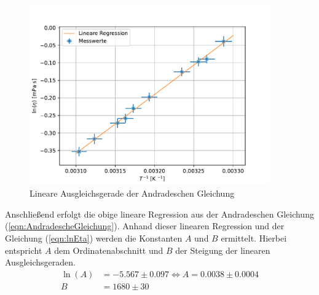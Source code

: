 \begin{figure}[H]
  \centering
  \includegraphics[width=0.92\textwidth]{plot.pdf}
  \caption{Lineare Ausgleichsgerade der Andradeschen Gleichung}
  \label{fig:plot}
\end{figure}
Anschließend erfolgt die obige lineare Regression aus 
der Andradeschen Gleichung (\ref{eqn:AndradescheGleichung}). 
Anhand dieser linearen Regression und der Gleichung (\ref{eqn:lnEta}) werden die Konstanten $A$ und $B$ 
ermittelt. Hierbei entspricht $A$ dem Ordinatenabschnitt und $B$ der Steigung der 
linearen Ausgleichsgeraden.
\begin{align*}
  \ln\left(A\right) &= -5.567 \pm 0.097 \Longleftrightarrow A = 0.0038\pm0.0004\\
  B &= 1680\pm30
\end{align*}
